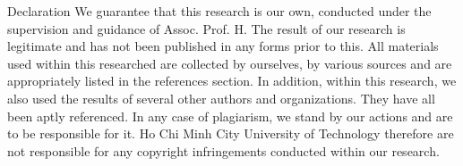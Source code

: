 \begin{preface}{Declaration}
  We guarantee that this research is our own, conducted under the supervision and guidance of Assoc\@. Prof\@. H. The result of our research is legitimate and has not been published in any forms prior to this. All materials used within this researched are collected by ourselves, by various sources and are appropriately listed in the references section. In addition, within this research, we also used the results of several other authors and organizations. They have all been aptly referenced. In any case of plagiarism, we stand by our actions and are to be responsible for it. Ho Chi Minh City University of Technology therefore are not responsible for any copyright infringements conducted within our research.
\end{preface}
